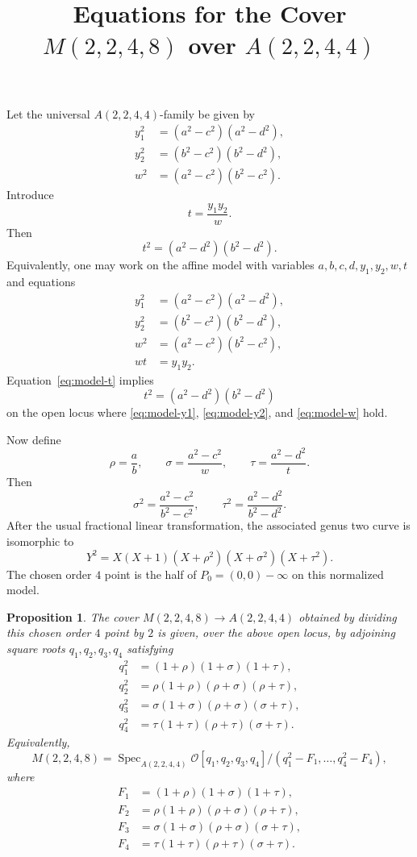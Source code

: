 \documentclass[11pt]{article}
\newtheorem{proposition}{Proposition}
\DeclareMathOperator{\Spec}{Spec}
\begin{document}
\title{Equations for the Cover $M(2,2,4,8)$ over $A(2,2,4,4)$}
\author{}
\date{}
\maketitle

Let the universal $A(2,2,4,4)$-family be given by
\begin{align}
    y_1^2&=(a^2-c^2)(a^2-d^2), \label{eq:A2244-y1}\\
    y_2^2&=(b^2-c^2)(b^2-d^2), \label{eq:A2244-y2}\\
    w^2&=(a^2-c^2)(b^2-c^2). \label{eq:A2244-w}
\end{align}
Introduce
\[
    t=\frac{y_1y_2}{w}.
\]
Then
\[
    t^2=(a^2-d^2)(b^2-d^2).
\]
Equivalently, one may work on the affine model with variables
$a,b,c,d,y_1,y_2,w,t$ and equations
\begin{align}
    y_1^2&=(a^2-c^2)(a^2-d^2), \label{eq:model-y1}\\
    y_2^2&=(b^2-c^2)(b^2-d^2), \label{eq:model-y2}\\
    w^2&=(a^2-c^2)(b^2-c^2), \label{eq:model-w}\\
    wt&=y_1y_2. \label{eq:model-t}
\end{align}
Equation~\eqref{eq:model-t} implies
\[
    t^2=(a^2-d^2)(b^2-d^2)
\]
on the open locus where \eqref{eq:model-y1}, \eqref{eq:model-y2}, and
\eqref{eq:model-w} hold.

Now define
\[
    \rho=\frac ab,
    \qquad
    \sigma=\frac{a^2-c^2}{w},
    \qquad
    \tau=\frac{a^2-d^2}{t}.
\]
Then
\[
    \sigma^2=\frac{a^2-c^2}{b^2-c^2},
    \qquad
    \tau^2=\frac{a^2-d^2}{b^2-d^2}.
\]
After the usual fractional linear transformation, the associated genus two
curve is isomorphic to
\[
    Y^2=X(X+1)(X+\rho^2)(X+\sigma^2)(X+\tau^2).
\]
The chosen order $4$ point is the half of $P_0=(0,0)-\infty$ on this
normalized model.

\begin{proposition}
The cover $M(2,2,4,8)\to A(2,2,4,4)$ obtained by dividing this chosen
order $4$ point by $2$ is given, over the above open locus, by adjoining
square roots $q_1,q_2,q_3,q_4$ satisfying
\begin{align}
    q_1^2&=(1+\rho)(1+\sigma)(1+\tau), \label{eq:q1-rational}\\
    q_2^2&=\rho(1+\rho)(\rho+\sigma)(\rho+\tau), \label{eq:q2-rational}\\
    q_3^2&=\sigma(1+\sigma)(\rho+\sigma)(\sigma+\tau), \label{eq:q3-rational}\\
    q_4^2&=\tau(1+\tau)(\rho+\tau)(\sigma+\tau). \label{eq:q4-rational}
\end{align}
Equivalently,
\[
M(2,2,4,8)
=
\Spec_{A(2,2,4,4)}
\mathcal O[q_1,q_2,q_3,q_4]/(q_1^2-F_1,\ldots,q_4^2-F_4),
\]
where
\begin{align*}
F_1&=(1+\rho)(1+\sigma)(1+\tau),\\
F_2&=\rho(1+\rho)(\rho+\sigma)(\rho+\tau),\\
F_3&=\sigma(1+\sigma)(\rho+\sigma)(\sigma+\tau),\\
F_4&=\tau(1+\tau)(\rho+\tau)(\sigma+\tau).
\end{align*}
\end{proposition}
\end{document}
